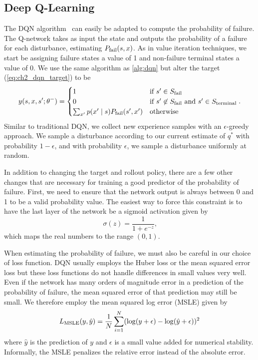 \subsection{Deep Q-Learning}

The DQN algorithm~\cite{mnih2015human} can easily be adapted to compute the probability of failure. The Q-network takes as input the state and outputs the probability of a failure for each disturbance, estimating $P_{\rm fail}(s, x)$. As in value iteration techniques, we start be assigning failure states a value of \num{1} and non-failure terminal states a value of \num{0}. We use the same algorithm as \cref{alg:dqn} but alter the target (\cref{eq:ch2_dqn_target}) to be 
\begin{equation}
    y(s, x, s^\prime; \theta^-) = \begin{cases}
    1 & \text{if } s^\prime \in S_{\rm fail} \\ 
    0 & \text{if } s^\prime \not \in S_{\rm fail} \text{ and } s^\prime \in S_{\rm terminal} \\ 
    \sum_{x^\prime}p(x^\prime \mid s) P_{\rm fail}(s^\prime, x^\prime) & \text{otherwise} \\
    \end{cases} \text{.}
\end{equation}
Similar to traditional DQN, we collect new experience samples with an $\epsilon$-greedy approach. We sample a disturbance according to our current estimate of $q^*$ with probability $1-\epsilon$, and with probability $\epsilon$, we sample a disturbance uniformly at random.

In addition to changing the target and rollout policy, there are a few other changes that are necessary for training a good predictor of the probability of failure. First, we need to ensure that the network output is always between \num{0} and \num{1} to be a valid probability value. The easiest way to force this constraint is to have the last layer of the network be a sigmoid activation given by 
\begin{equation}
    \sigma(z) = \frac{1}{1 + e^{-z}} \text{,}
\end{equation}
which maps the real numbers to the range $(0,1)$. 

When estimating the probability of failure, we must also be careful in our choice of loss function. DQN usually employs the Huber loss or the mean squared error loss but these loss functions do not handle differences in small values very well. Even if the network has many orders of magnitude error in a prediction of the probability of failure, the mean squared error of that prediction may still be small. We therefore employ the mean squared log error (MSLE) given by
\begin{equation}
    L_{\rm MSLE}(y, \hat{y}) = \frac{1}{N}\sum_{i=1}^N (\log(y + \epsilon) - \log(\hat{y} + \epsilon))^2
\end{equation}
where $\hat{y}$ is the prediction of $y$ and $\epsilon$ is a small value added for numerical stability. Informally, the MSLE penalizes the relative error instead of the absolute error. 

